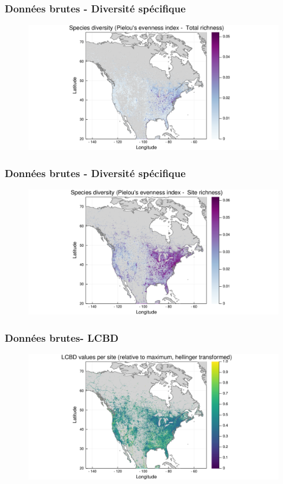 \documentclass[10pt]{beamer}
\begin{document}
\begin{frame}
  \frametitle{Données brutes - Diversité spécifique}
  \begin{figure}
    \centering
    \hspace*{-2cm}\includegraphics[scale=0.5]{fig/raw-diversity-pielou2.pdf}
  \end{figure}
\end{frame}

\begin{frame}
  \frametitle{Données brutes - Diversité spécifique}
  \begin{figure}
    \centering
    \hspace*{-2cm}\includegraphics[scale=0.5]{fig/raw-diversity-pielou.pdf}
  \end{figure}
\end{frame}

\begin{frame}
  \frametitle{Données brutes- LCBD}
  \begin{figure}
    \centering
    \hspace*{-2cm}\includegraphics[scale=0.5]{fig/raw-lcbd-transf.pdf}
  \end{figure}
\end{frame}
\end{document}
